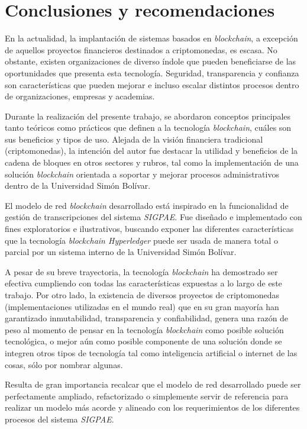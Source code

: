 
\chapter{Conclusiones y recomendaciones}
\label{capitulo5}
En la actualidad, la implantación de sistemas basados en \textit{blockchain}, a  excepción de aquellos proyectos financieros destinados a criptomonedas, es escasa. No obstante, existen organizaciones de diverso índole que pueden beneficiarse de las oportunidades que presenta esta tecnología. Seguridad, transparencia y confianza son características que pueden mejorar e incluso escalar distintos procesos dentro de organizaciones, empresas y academias.

Durante la realización del presente trabajo, se abordaron conceptos principales tanto teóricos como prácticos que definen a la tecnología \textit{blockchain}, cuáles son sus beneficios y tipos de uso. Alejada de la visión financiera tradicional (criptomonedas), la intención del autor fue destacar la utilidad y beneficios de la cadena de bloques en otros sectores y rubros, tal como la implementación de una solución \textit{blockchain} orientada a soportar y mejorar procesos administrativos dentro de la Universidad Simón Bolívar.


El modelo de red \textit{blockchain} desarrollado está inspirado en la funcionalidad de gestión de transcripciones del sistema \textit{SIGPAE}. Fue diseñado e implementado con fines exploratorios e ilustrativos, buscando exponer las diferentes características que la tecnología \textit{blockchain Hyperledger}  puede ser usada de manera total o parcial por un sistema interno de la Universidad Simón Bolívar. 

A pesar de su breve trayectoria, la tecnología \textit{blockchain} ha demostrado ser efectiva cumpliendo con todas las características expuestas a lo largo de este trabajo. Por otro lado, la existencia de diversos proyectos de criptomonedas (implementaciones utilizadas en el mundo real) que en su gran mayoría han garantizado inmutabilidad, transparencia y confiabilidad, genera una razón de peso al momento de pensar en la tecnología \textit{blockchain} como posible solución tecnológica, o mejor aún como posible componente de una solución donde se integren otros tipos de tecnología tal como inteligencia artificial o internet de las cosas, sólo por nombrar algunas.

Resulta de gran importancia recalcar que el modelo de red desarrollado puede ser perfectamente ampliado, refactorizado o simplemente servir de referencia para realizar un modelo más acorde y alineado con los requerimientos de los diferentes procesos del sistema \textit{SIGPAE}. 

